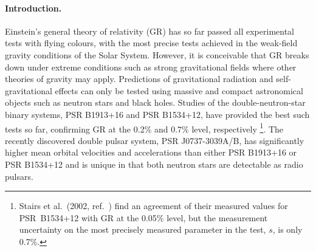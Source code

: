 \documentclass[12pt,psfig]{article}
\begin{document}


\paragraph*{Introduction.}


Einstein's general theory of relativity (GR) has so far passed all
experimental tests with flying colours\cite{wil01}, with the most
precise tests achieved in the weak-field gravity conditions of the Solar
System\cite{bit03,wtb04}.  However, it is conceivable that GR breaks
down under extreme conditions such as strong gravitational fields
where other theories of gravity may apply\cite{de98}. 
Predictions of gravitational radiation and
self-gravitational effects can only be tested using massive and
compact astronomical objects such as neutron stars and black
holes. Studies of the double-neutron-star binary systems, PSR B1913+16
and PSR B1534+12, have provided the best such tests so
far, confirming GR at the 0.2\% and 0.7\% level,
respectively\cite{tw89,sttw02}
\footnote{
Stairs et al.~(2002, ref.~\cite{sttw02}) 
find an agreement of their measured
values for PSR~B1534+12 with GR at the 0.05\% level, but the measurement
uncertainty on the most precisely measured parameter in the test, $s$, is
only 0.7\%.}.
The recently discovered double pulsar system,
PSR J0737-3039A/B, has significantly higher mean orbital velocities
and accelerations than either PSR B1913+16 or PSR B1534+12 and is
unique in that both neutron stars are detectable as radio
pulsars\cite{bdp+03,lbk+04}.
\end{document}
